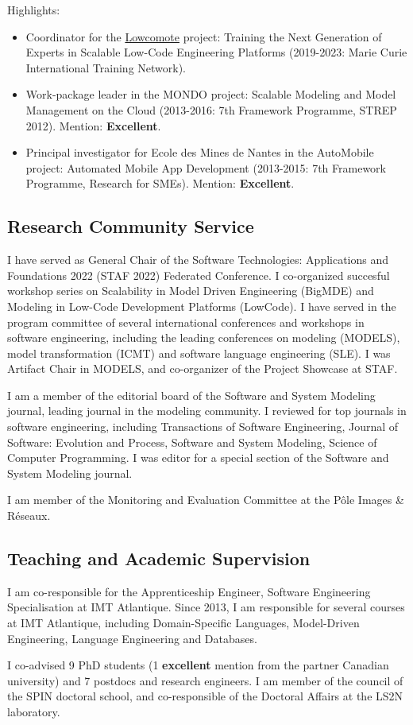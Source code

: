 \medskip
Highlights:
 \begin{itemize}
 \item Coordinator for the \href{https://www.lowcomote.eu/}{Lowcomote} project: Training the Next Generation of Experts in Scalable Low-Code Engineering Platforms (2019-2023: Marie Curie International Training Network).
 \item Work-package leader in the MONDO project: Scalable Modeling and Model Management on the Cloud (2013-2016: 7th Framework Programme, STREP 2012). Mention: \textbf{Excellent}.
 \item Principal investigator for Ecole des Mines de Nantes in the AutoMobile project: Automated Mobile App Development (2013-2015: 7th Framework Programme, Research for SMEs). Mention: \textbf{Excellent}.
\end{itemize}

\subsection*{Research Community Service}

I have served as General Chair of the Software Technologies: Applications and Foundations 2022 (STAF 2022) Federated Conference. I co-organized succesful workshop series on Scalability in Model Driven Engineering (BigMDE) and Modeling in Low-Code Development Platforms (LowCode). 
I have served in the program committee of several international conferences and workshops in software engineering, including the leading conferences on modeling (MODELS), model transformation (ICMT) and software language engineering (SLE). I was Artifact Chair in MODELS, and co-organizer of the Project Showcase at STAF.

I am a member of the editorial board of the Software and System Modeling journal, leading journal in the modeling community. I reviewed for top journals in software engineering, including Transactions of Software Engineering, Journal of Software: Evolution and Process, Software and System Modeling, Science of Computer Programming. I was editor for a special section of the Software and System Modeling journal.

I am member of the Monitoring and Evaluation Committee at the Pôle Images \& Réseaux.

\subsection*{Teaching and Academic Supervision}

I am co-responsible for the Apprenticeship Engineer, Software Engineering Specialisation at IMT Atlantique. Since 2013, I am responsible for several courses at IMT Atlantique, including Domain-Specific Languages, Model-Driven Engineering, Language Engineering and Databases.

I co-advised 9 PhD students (1 \textbf{excellent} mention from the partner Canadian university) and 7 postdocs and research engineers. I am member of the council of the SPIN doctoral school, and co-responsible of the Doctoral Affairs at the LS2N laboratory.
